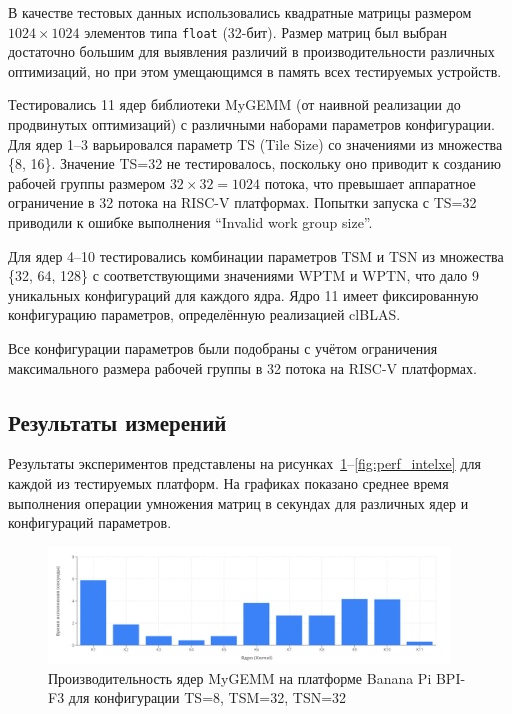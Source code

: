 В качестве тестовых данных использовались квадратные матрицы размером $1024 \times 1024$ элементов типа \texttt{float} (32-бит). Размер матриц был выбран достаточно большим для выявления различий в производительности различных оптимизаций, но при этом умещающимся в память всех тестируемых устройств.

Тестировались 11 ядер библиотеки MyGEMM (от наивной реализации до продвинутых оптимизаций) с различными наборами параметров конфигурации. Для ядер 1--3 варьировался параметр TS (Tile Size) со значениями из множества \{8, 16\}. Значение TS=32 не тестировалось, поскольку оно приводит к созданию рабочей группы размером $32 \times 32 = 1024$ потока, что превышает аппаратное ограничение в 32 потока на RISC-V платформах. Попытки запуска с TS=32 приводили к ошибке выполнения ``Invalid work group size''.

Для ядер 4--10 тестировались комбинации параметров TSM и TSN из множества \{32, 64, 128\} с соответствующими значениями WPTM и WPTN, что дало 9 уникальных конфигураций для каждого ядра. Ядро 11 имеет фиксированную конфигурацию параметров, определённую реализацией clBLAS.

Все конфигурации параметров были подобраны с учётом ограничения максимального размера рабочей группы в 32 потока на RISC-V платформах.

\subsection{Результаты измерений}

Результаты экспериментов представлены на рисунках~\ref{fig:perf_bananapi}--\ref{fig:perf_intelxe} для каждой из тестируемых платформ. На графиках показано среднее время выполнения операции умножения матриц в секундах для различных ядер и конфигураций параметров.

\begin{figure}[ht]
\centering
\includegraphics[width=0.95\textwidth]{figures/banana_pi_83232.png}
\caption{Производительность ядер MyGEMM на платформе Banana Pi BPI-F3 для конфигурации TS=8, TSM=32, TSN=32}
\label{fig:perf_bananapi}
\end{figure}

